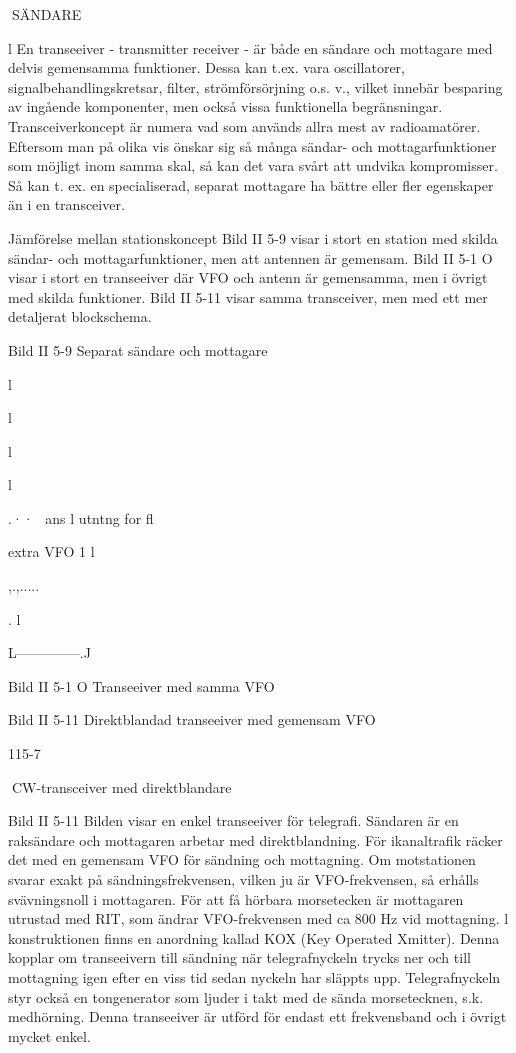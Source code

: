 \documentclass[a4paper,twoside,twocolumn,openright]{book}
\begin{document}
{{{SÄNDARE

l
En transeeiver - transmitter receiver - är
både en sändare och mottagare med delvis
gemensamma funktioner. Dessa kan t.ex.
vara oscillatorer, signalbehandlingskretsar,
filter, strömförsörjning o.s. v., vilket innebär
besparing av ingående komponenter, men
också vissa funktionella begränsningar.
Transceiverkoncept är numera vad som
används allra mest av radioamatörer. Eftersom man på olika vis önskar sig så många
sändar- och mottagarfunktioner som möjligt
inom samma skal, så kan det vara svårt att
undvika kompromisser. Så kan t. ex. en
specialiserad, separat mottagare ha bättre
eller fler egenskaper än i en transceiver.

Jämförelse mellan stationskoncept
Bild II 5-9 visar i stort en station med skilda
sändar- och mottagarfunktioner, men att
antennen är gemensam.
Bild II 5-1 O visar i stort en transeeiver där
VFO och antenn är gemensamma, men i
övrigt med skilda funktioner.
Bild II 5-11 visar samma transceiver, men
med ett mer detaljerat blockschema.

Bild II 5-9 Separat sändare och mottagare

l

l

l

l

.··~
ans l utntng
for fl

extra VFO
1
l

,.,.....

.
l

L--------------.J

Bild II 5-1 O Transeeiver med samma VFO

Bild II 5-11 Direktblandad transeeiver med gemensam VFO

115-7

CW-transceiver med direktblandare

Bild II 5-11
Bilden visar en enkel transeeiver för telegrafi. Sändaren är en raksändare och mottagaren arbetar med direktblandning. För ikanaltrafik räcker det med en gemensam
VFO för sändning och mottagning. Om motstationen svarar exakt på sändningsfrekvensen, vilken ju är VFO-frekvensen, så
erhålls svävningsnoll i mottagaren. För att
få hörbara morsetecken är mottagaren utrustad med RIT, som ändrar VFO-frekvensen med ca 800 Hz vid mottagning.
l konstruktionen finns en anordning kallad KOX (Key Operated Xmitter). Denna
kopplar om transeeivern till sändning när
telegrafnyckeln trycks ner och till mottagning igen efter en viss tid sedan nyckeln har
släppts upp. Telegrafnyckeln styr också en
tongenerator som ljuder i takt med de sända
morsetecknen, s.k. medhörning.
Denna transeeiver är utförd för endast
ett frekvensband och i övrigt mycket enkel.

}}}
\end{document}
